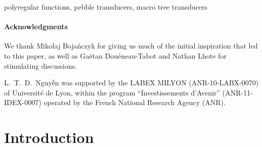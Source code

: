 \documentclass{fundam}
\theoremstyle{claimstyle}
\begin{document}
\begin{keywords}
  polyregular functions, pebble transducers, macro tree transducers
\end{keywords}

\paragraph*{Acknowledgments}

We thank Mikołaj Bojańczyk for giving us much of the initial
inspiration that led to this paper, as well as Gaëtan Douéneau-Tabot and Nathan
Lhote for stimulating discussions.

{\footnotesize L.~T.~D.~{\selectfont{}Nguyễn} was supported by the LABEX MILYON (ANR-10-LABX-0070) of Université de Lyon, within the program \enquote{Investissements d'Avenir} (ANR-11-IDEX-0007) operated by the French National Research Agency (ANR).}

  \section{Introduction}
\end{document}
